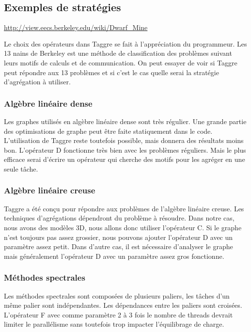 \subsection{Exemples de stratégies}
\url{http://view.eecs.berkeley.edu/wiki/Dwarf_Mine}

Le choix des opérateurs dans Taggre se fait à l'appréciation du programmeur.
%
Les 13 nains de Berkeley est une méthode de classification des problèmes suivant leurs motifs de calculs et de communication.
%
On peut essayer de voir si Taggre peut répondre aux 13 problèmes et si c'est le cas quelle serai la stratégie d'agrégation à utiliser.

\subsubsection{Algèbre linéaire dense}
Les graphes utilisés en algèbre linéaire dense sont très régulier.
%
Une grande partie des optimisations de graphe peut être faite statiquement dans le code.
%
L'utilisation de Taggre reste toutefois possible, mais donnera des résultats moins bon.
%
L'opérateur D fonctionne très bien avec les problèmes réguliers.
%
Mais le plus efficace serai d'écrire un opérateur qui cherche des motifs pour les agréger en une seule tâche.


\subsubsection{Algèbre linéaire creuse}
Taggre a été conçu pour répondre aux problèmes de l'algèbre linéaire creuse.
%
Les techniques d'agrégations dépendront du problème à résoudre.
%
Dans notre cas, nous avons des modèles 3D, nous allons donc utiliser l'opérateur C.
%
Si le graphe n'est toujours pas assez grossier, nous pouvons ajouter l'opérateur D avec un paramètre assez petit.
%
Dans d'autre cas, il est nécessaire d'analyser le graphe mais généralement l'opérateur D avec un paramètre assez gros fonctionne.



\subsubsection{Méthodes spectrales}
Les méthodes spectrales sont composées de plusieurs paliers, les tâches d'un même palier sont indépendantes.
%
Les dépendances entre les paliers sont croisées.
%
L'opérateur F avec comme paramètre 2 à 3 fois le nombre de threads devrait limiter le parallélisme sans toutefois trop impacter l'équilibrage de charge.



